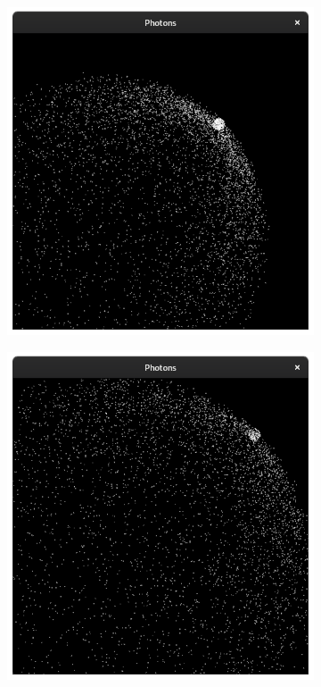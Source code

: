 \documentclass{stdlocal}
\begin{document}
\begin{figure}[p]
\begin{subfigure}[b]{0.24\textwidth}
      \end{subfigure}
      \begin{subfigure}[b]{0.24\textwidth}
        \center
        \includegraphics[width=\textwidth,trim={0 0 0 2cm},clip]{images/photons_1_07.png}
      \end{subfigure}
      \begin{subfigure}[b]{0.24\textwidth}
        \center
        \includegraphics[width=\textwidth,trim={0 0 0 2cm},clip]{images/photons_1_08.png}

\end{subfigure}
\end{figure}
\end{document}
